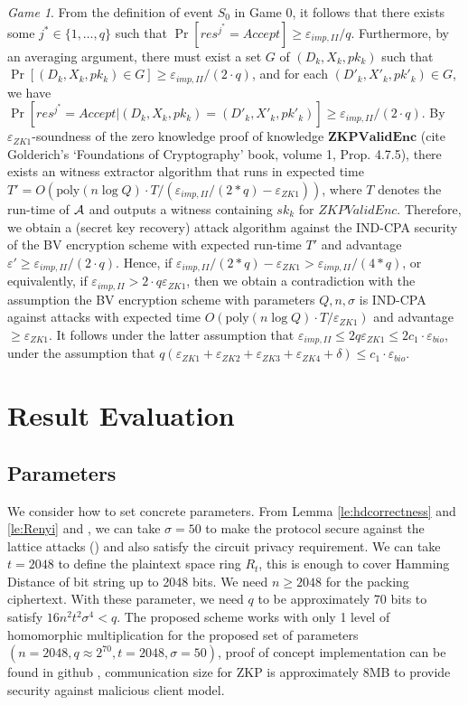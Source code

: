 \textit{Game 1}. From the definition of event $S_0$ in Game 0, it follows that there exists some $j^* \in \{1,\ldots,q\}$ such that $\Pr[res^{j^*} = Accept] \geq \varepsilon_{imp,II}/q$. Furthermore, by an averaging argument, there must exist a set $G$ of $(D_k,X_k,pk_k)$ such that $\Pr[(D_k,X_k,pk_k) \in G] \geq \varepsilon_{imp,II}/(2 \cdot q)$, and for each $(D'_k,X'_k,pk'_k) \in G$, we have $\Pr[res^{j^*} = Accept |(D_k,X_k,pk_k)=(D'_k,X'_k,pk'_k)] \geq  \varepsilon_{imp,II}/(2 \cdot q)$. By $\varepsilon_{ZK1}$-soundness of the zero knowledge proof of knowledge $\mathbf{ZKPValidEnc}$ (cite Golderich's `Foundations of Cryptography' book, volume 1, Prop. 4.7.5), there exists an witness extractor algorithm that runs in expected time $T'=O(\mathrm{poly}(n \log Q) \cdot T / (\varepsilon_{imp,II}/(2*q) - \varepsilon_{ZK1}))$, where $T$ denotes the run-time of $\mathcal{A}$ and outputs a witness containing $sk_k$ for ${ZKPValidEnc}$. Therefore, we obtain a (secret key recovery) attack algorithm against the IND-CPA security of the BV encryption scheme with expected run-time $T'$ and advantage $\varepsilon' \geq \varepsilon_{imp,II}/(2 \cdot q)$. Hence,  if $\varepsilon_{imp,II}/(2*q) - \varepsilon_{ZK1} > \varepsilon_{imp,II}/(4*q)$, or equivalently, if $\varepsilon_{imp,II} > 2 \cdot q \varepsilon_{ZK1}$, then we obtain a contradiction with the assumption the BV encryption scheme with parameters $Q,n,\sigma$ is IND-CPA against attacks with expected time $O(\mathrm{poly}(n \log Q) \cdot T / \varepsilon_{ZK1})$ and advantage $\geq \varepsilon_{ZK1}$. It follows under the latter assumption that $\varepsilon_{imp,II} \leq 2q \varepsilon_{ZK1} \leq 2 c_1  \cdot \varepsilon_{bio}$, under the assumption that  $q(\varepsilon_{ZK1}+\varepsilon_{ZK2} +
\varepsilon_{ZK3} + \varepsilon_{ZK4} + \delta) \leq c_1 \cdot \varepsilon_{bio}$.


\section{Result Evaluation}

\subsection{Parameters}
\label{sec:parameters}
We consider how to set concrete parameters. From Lemma \ref{le:hdcorrectness} and \ref{le:Renyi} and
\cite{EPRINT:LauNaeVai11}, we can take \(\sigma = 50\) to make the protocol secure against the lattice attacks
(\cite{micciancio2008lattice}) and
also satisfy the circuit privacy requirement. We can take \(t = 2048\) to define the plaintext space ring \(R_{t}\),
this is enough to cover Hamming Distance of bit string up to 2048 bits. We need \(n \geq 2048\) for the packing
ciphertext. With these parameter, we need \(q\) to be approximately 70 bits to satisfy \(16n^{2}t^{2}\sigma^{4} < q\).
The proposed scheme works with only 1 level of homomorphic multiplication for the proposed set of parameters
$(n = 2048, q \approx 2^{70}, t = 2048, \sigma = 50)$, proof of concept implementation can be found in github
\cite{rimrimrq38:online}, communication size for ZKP is approximately 8MB to provide security against malicious client
model.

